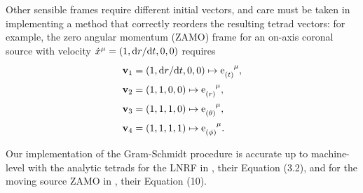 Other sensible frames require different initial vectors, and care must be taken in implementing a method that correctly reorders the resulting tetrad vectors: for example, the zero angular momentum (ZAMO) frame for an on-axis coronal source with velocity $\dot{x}^\mu = (1, \text{d} r / \text{d} t, 0, 0)$ requires
\begin{align}
    \vector{v}_1 &= \left(1, \d r / \d t, 0, 0 \right) \mapsto \dtensor{\e}{(t)}{\mu}, \nonumber \\
    \vector{v}_2 &= \left(1, 1, 0, 0\right) \mapsto \dtensor{\e}{(r)}{\mu}, \nonumber \\
    \vector{v}_3 &= \left(1, 1, 1, 0\right) \mapsto \dtensor{\e}{(\theta)}{\mu}, \nonumber \\
    \vector{v}_4 &= \left(1, 1, 1, 1\right) \mapsto \dtensor{\e}{(\phi)}{\mu}.
\end{align}

Our implementation of the Gram-Schmidt procedure is accurate up to machine-level with the analytic tetrads for the LNRF in \cite{bardeen_rotating_1972}, their Equation (3.2), and for the moving source ZAMO in \cite{gonzalez_probing_2017}, their Equation (10).
